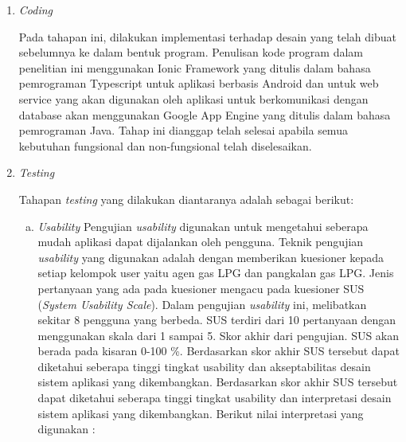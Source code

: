 \begin{enumerate}[1.]
	
	\item \textit{Coding}
	
	Pada tahapan ini, dilakukan implementasi terhadap desain yang telah dibuat sebelumnya ke dalam bentuk program. Penulisan kode program dalam penelitian ini menggunakan Ionic Framework yang ditulis dalam bahasa pemrograman Typescript untuk aplikasi berbasis Android dan untuk web service yang akan digunakan oleh aplikasi untuk berkomunikasi dengan database akan menggunakan Google App Engine yang ditulis dalam bahasa pemrograman Java. Tahap ini dianggap telah selesai apabila semua kebutuhan fungsional dan non-fungsional telah diselesaikan.

	 \item \textit{Testing}
	
	Tahapan \textit{testing} yang dilakukan diantaranya adalah sebagai berikut:
	\begin{enumerate}[a.]
			\itemsep0em
			\item \textit{Usability}
			\newline Pengujian \textit{usability} digunakan untuk mengetahui seberapa mudah aplikasi dapat dijalankan oleh pengguna. Teknik pengujian \textit{usability} yang digunakan adalah dengan memberikan kuesioner kepada setiap kelompok user yaitu agen gas LPG dan pangkalan gas LPG. Jenis pertanyaan yang ada pada kuesioner mengacu pada kuesioner SUS (\textit{System Usability Scale}). Dalam pengujian \textit{usability} ini, melibatkan sekitar 8 pengguna yang berbeda. SUS terdiri dari 10
			pertanyaan dengan menggunakan skala dari 1 sampai 5. Skor akhir dari pengujian. SUS akan berada pada kisaran 0-100 \%. Berdasarkan skor akhir SUS tersebut dapat diketahui seberapa tinggi tingkat usability dan akseptabilitas desain sistem aplikasi yang dikembangkan. Berdasarkan skor akhir SUS tersebut dapat diketahui seberapa tinggi tingkat usability dan interpretasi desain sistem aplikasi yang dikembangkan. Berikut
			nilai interpretasi yang digunakan :
			

\end{enumerate}
\end{enumerate}
